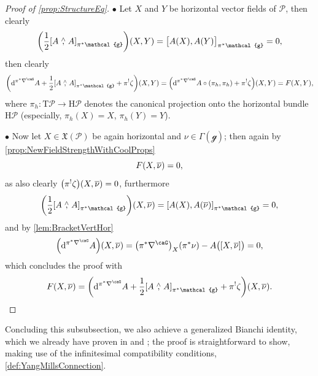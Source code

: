 \documentclass[reqno,a4paper,oneside]{amsart}
\theoremstyle{plain}
\theoremstyle{remark}
\theoremstyle{definition}
\begin{document}
\begin{proof}[Proof of \ref{prop:StructureEq}]
$\bullet$ Let $X$ and $Y$ be horizontal vector fields of $\mathcal{P}$, then clearly
\begin{equation*}
\mleft(\frac{1}{2} \mleft[ A \stackrel{\wedge}{,} A \mright]_{\pi^*\mathcal{g}}\mright)(X, Y)
=
\bigl[ A\mleft( X \mright), A\mleft( Y \mright) \bigr]_{\pi^*\mathcal{g}}
=
0,
\end{equation*}
then clearly
\begin{equation*}
\mleft(
	\mathrm{d}^{\pi^*\nabla^\caG} A
	+ \frac{1}{2} \mleft[ A \stackrel{\wedge}{,} A \mright]_{\pi^*\mathcal{g}}
	+ \pi^!\zeta
\mright)(X, Y)
=
\mleft(
	\mathrm{d}^{\pi^*\nabla^\caG} A \circ \mleft( \pi_h, \pi_h \mright)
	+ \pi^!\zeta
\mright)(X, Y)
=
F(X, Y),
\end{equation*}
where $\pi_h\colon \mathrm{T}\mathcal{P} \to \mathrm{H}\mathcal{P}$ denotes the canonical projection onto the horizontal bundle $\mathrm{H}\mathcal{P}$ (especially, $\pi_h(X) = X$, $\pi_h(Y)= Y$).

$\bullet$ Now let $X \in \mathfrak{X}(\mathcal{P})$ be again horizontal and $\nu \in \Gamma(\mathcal{g})$; then again by \ref{prop:NewFieldStrengthWithCoolProps}
\begin{equation*}
F\mleft(X, \overline{\nu}\mright)
=
0,
\end{equation*}
as also clearly $\mleft( \pi^!\zeta \mright)\mleft(X, \overline{\nu}\mright) = 0$,
furthermore
\begin{equation*}
\mleft(\frac{1}{2} \mleft[ A \stackrel{\wedge}{,} A \mright]_{\pi^*\mathcal{g}}\mright)\mleft( X, \overline{\nu} \mright)
=
\mleft[ A(X), A\mleft( \overline{\nu} \mright) \mright]_{\pi^*\mathcal{g}}
=
0,
\end{equation*}
and by \ref{lem:BracketVertHor}
\begin{equation*}
\mleft(\mathrm{d}^{\pi^*\nabla^\caG} A\mright)\mleft( X, \overline{\nu} \mright)
=
\mleft( \pi^*\nabla^\caG \mright)_X \mleft( \pi^*\nu \mright)
	- A\bigl( \mleft[ X, \overline{\nu} \mright] \bigr)
=
0,
\end{equation*}
which concludes the proof with
\begin{equation*}
F\mleft(X, \overline{\nu}\mright)
=
\mleft(
	\mathrm{d}^{\pi^*\nabla^\caG} A
	+ \frac{1}{2} \mleft[ A \stackrel{\wedge}{,} A \mright]_{\pi^*\mathcal{g}}
	+ \pi^!\zeta
\mright)\mleft(X, \overline{\nu}\mright).
\end{equation*}
\end{proof}

Concluding this subsubsection, we also achieve a generalized Bianchi identity, which we already have proven in \cite[\S 7, Thm.\ 7.3]{My1stpaper} and \cite[\S 5, Thm.\ 5.1.42]{MyThesis}; the proof is straightforward to show, making use of the infinitesimal compatibility conditions, \ref{def:YangMillsConnection}.
\end{document}
